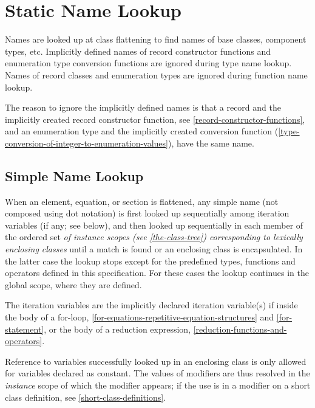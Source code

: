 \section{Static Name Lookup}

Names are looked up at class flattening to find names of base classes,
component types, etc. Implicitly defined names of record constructor
functions and enumeration type conversion functions are ignored during
type name lookup. Names of record classes and enumeration types are ignored during function name lookup.

\begin{nonnormative}
The reason to ignore the implicitly defined names is that a record and the implicitly created record constructor function, see \autoref{record-constructor-functions},
and an enumeration type and the implicitly created conversion function (\autoref{type-conversion-of-integer-to-enumeration-values}), have the same name.
\end{nonnormative}

\subsection{Simple Name Lookup}

When an element, equation, or section is flattened, any simple name
(not composed using dot notation) is first looked up sequentially among
iteration variables (if any; see below), and then looked up sequentially in each
member of the ordered set \emph{of instance scopes (see
\autoref{the-class-tree}) corresponding to lexically enclosing classes} until a
match is found or an enclosing class is encapsulated. In the latter case
the lookup stops except for the predefined types, functions and
operators defined in this specification. For these cases the lookup continues in the global scope, where they are defined.

The iteration variables are the implicitly declared iteration variable(s) if inside
the body of a for-loop, \autoref{for-equations-repetitive-equation-structures} and \autoref{for-statement},
or the body of a reduction expression, \autoref{reduction-functions-and-operators}.

Reference to variables successfully looked up in an enclosing class is
only allowed for variables declared as constant. The values of modifiers
are thus resolved in the \emph{instance} scope of which the modifier
appears; if the use is in a modifier on a short class definition, see \autoref{short-class-definitions}.

